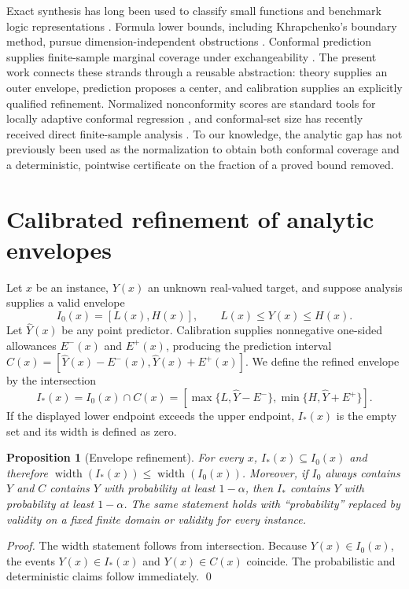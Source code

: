 \documentclass[10pt]{article}
\newtheorem{proposition}[theorem]{Proposition}
\begin{document}
Exact synthesis has long been used to classify small functions and benchmark
logic representations \cite{haaswijk2017,turan2015}.  Formula lower bounds,
including Khrapchenko's boundary method, pursue dimension-independent
obstructions \cite{khrapchenko1971,jukna2012}.  Conformal prediction supplies
finite-sample marginal coverage under exchangeability
\cite{vovk2005,lei2018}.  The present work connects these strands through a
reusable abstraction: theory supplies an outer envelope, prediction proposes
a center, and calibration supplies an explicitly qualified refinement.
Normalized nonconformity scores are standard tools for locally adaptive
conformal regression \cite{bostrom2020,seedat2023}, and conformal-set size has
recently received direct finite-sample analysis \cite{dhillon2024}.  To our
knowledge, the analytic gap has not previously been used as the normalization
to obtain both conformal coverage and a deterministic, pointwise certificate
on the fraction of a proved bound removed.

\section{Calibrated refinement of analytic envelopes}

Let $x$ be an instance, $Y(x)$ an unknown real-valued target, and suppose
analysis supplies a valid envelope
\begin{equation}
 I_0(x)=[L(x),H(x)],\qquad L(x)\le Y(x)\le H(x).
 \label{eq:outer}
\end{equation}
Let $\widehat Y(x)$ be any point predictor.  Calibration supplies nonnegative
one-sided allowances $E^-(x)$ and $E^+(x)$, producing the prediction interval
$C(x)=[\widehat Y(x)-E^-(x),\widehat Y(x)+E^+(x)]$.  We define the refined
envelope by the intersection
\begin{equation}
 I_*(x)=I_0(x)\cap C(x)
 =\left[\max\{L,\widehat Y-E^-\},
         \min\{H,\widehat Y+E^+\}\right].
 \label{eq:refined}
\end{equation}
If the displayed lower endpoint exceeds the upper endpoint, $I_*(x)$ is the
empty set and its width is defined as zero.

\begin{proposition}[Envelope refinement]
\label{prop:refinement}
For every $x$, $I_*(x)\subseteq I_0(x)$ and therefore
$\operatorname{width}(I_*(x))\le\operatorname{width}(I_0(x))$.  Moreover, if
$I_0$ always contains $Y$ and $C$ contains $Y$ with probability at least
$1-\alpha$, then $I_*$ contains $Y$ with probability at least $1-\alpha$.
The same statement holds with ``probability'' replaced by validity on a fixed
finite domain or validity for every instance.
\end{proposition}
\emph{Proof.}  The width statement follows from intersection.  Because
$Y(x)\in I_0(x)$, the events $Y(x)\in I_*(x)$ and $Y(x)\in C(x)$ coincide.
The probabilistic and deterministic claims follow immediately. \qed
\end{document}
